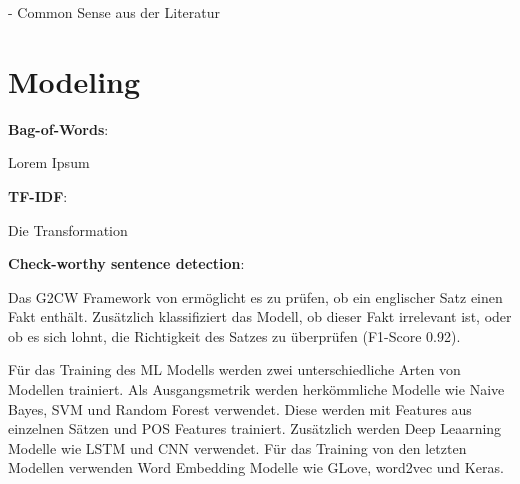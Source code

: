 - Common Sense aus der Literatur

\section{Modeling}

\textbf{Bag-of-Words}:

Lorem Ipsum

\textbf{TF-IDF}:

Die Transformation 

\textbf{Check-worthy sentence detection}:


Das G2CW Framework von \textcite{jha_towards_2023} ermöglicht es zu prüfen, ob ein englischer Satz einen Fakt enthält. Zusätzlich klassifiziert das Modell, ob dieser Fakt irrelevant ist, oder ob es sich lohnt, die Richtigkeit des Satzes zu überprüfen (F1-Score \num{0.92}).

Für das Training des \ac{ML} Modells werden zwei unterschiedliche Arten von Modellen trainiert. Als Ausgangsmetrik werden herkömmliche Modelle wie Naive Bayes, \ac{SVM} und Random Forest verwendet. Diese werden mit Features aus einzelnen Sätzen und \ac{POS} Features trainiert. Zusätzlich werden Deep Leaarning Modelle wie \ac{LSTM} und \ac{CNN} verwendet. Für das Training von den letzten Modellen verwenden \textcite{jha_towards_2023} Word Embedding Modelle wie GLove, word2vec und Keras.
